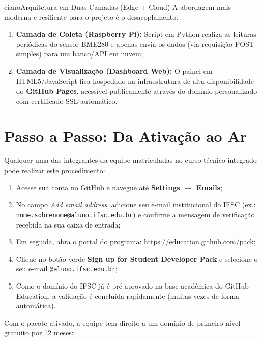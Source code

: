\begin{destaque}{ciano}{\faLayerGroup}{Arquitetura em Duas Camadas (Edge + Cloud)}
A abordagem mais moderna e resiliente para o projeto é o desacoplamento:
\begin{enumerate}
  \item \textbf{Camada de Coleta (Raspberry Pi):} Script em Python realiza as leituras periódicas do sensor BME280 e apenas envia os dados (via requisição POST simples) para um banco/API em nuvem;
  \item \textbf{Camada de Visualização (Dashboard Web):} O painel em HTML5/JavaScript fica hospedado na infraestrutura de alta disponibilidade do \textbf{GitHub Pages}, acessível publicamente através do domínio personalizado com certificado SSL automático.
\end{enumerate}
\end{destaque}

\section{Passo a Passo: Da Ativação ao Ar}


Qualquer uma das integrantes da equipe matriculadas no curso técnico integrado pode realizar este procedimento:

\begin{enumerate}
  \item Acesse sua conta no GitHub e navegue até \textbf{Settings $\rightarrow$ Emails};
  \item No campo \textit{Add email address}, adicione seu e-mail institucional do IFSC (ex.: \texttt{nome.sobrenome@aluno.ifsc.edu.br}) e confirme a mensagem de verificação recebida na sua caixa de entrada;
  \item Em seguida, abra o portal do programa: \url{https://education.github.com/pack};
  \item Clique no botão verde \textbf{Sign up for Student Developer Pack} e selecione o seu e-mail \texttt{@aluno.ifsc.edu.br};
  \item Como o domínio do IFSC já é pré-aprovado na base acadêmica do GitHub Education, a validação é concluída rapidamente (muitas vezes de forma automática).
\end{enumerate}


Com o pacote ativado, a equipe tem direito a um domínio de primeiro nível gratuito por 12 meses:


